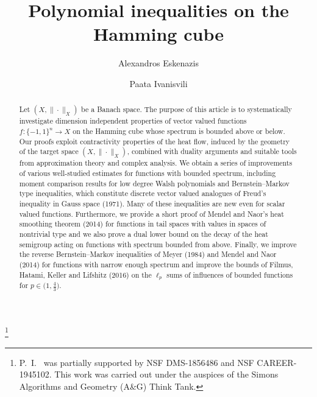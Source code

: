 \documentclass[11pt,reqno]{amsart}
\newcommand{\1}{\mathbf 1}
\theoremstyle{remark}
\begin{document}
\title{Polynomial inequalities on the Hamming cube}


\author{Alexandros Eskenazis}
\address{(A.~E.) Department of Mathematics\\ Princeton University\\ Princeton, NJ 08544-1000, USA}


\author{Paata Ivanisvili}
\address{(P.~I.) Department of Mathematics\\ University of California, Irvine\\ CA 92617, USA}

\thanks{P.~I.~ was partially supported by NSF DMS-1856486 and NSF CAREER-1945102. This work was carried out under the auspices of the Simons Algorithms and Geometry (A\&G) Think Tank.}



\vspace{-0.25in}

\begin{abstract} 
Let $(X,\|\cdot\|_X)$ be a Banach space. The purpose of this article is to systematically investigate dimension independent properties of vector valued functions $f:\{-1,1\}^n\to X$ on the Hamming cube whose spectrum is bounded above or below. Our proofs exploit contractivity properties of the heat flow, induced by the geometry of the target space $(X,\|\cdot\|_X)$, combined with duality arguments and suitable tools from approximation theory and complex analysis. We obtain a series of improvements of various well-studied estimates for functions with bounded spectrum, including moment comparison results for low degree Walsh polynomials and Bernstein--Markov type inequalities, which constitute discrete vector valued analogues of Freud's inequality in Gauss space (1971). Many of these inequalities are new even for scalar valued functions. Furthermore, we provide a short proof of Mendel and Naor's heat smoothing theorem (2014) for functions in tail spaces with values in spaces of nontrivial type and we also prove a dual lower bound on the decay of the heat semigroup acting on functions with spectrum bounded from above. Finally, we improve the reverse Bernstein--Markov inequalities of Meyer (1984) and Mendel and Naor (2014) for functions with narrow enough spectrum and improve the bounds of Filmus, Hatami, Keller and Lifshitz (2016) on the $\ell_p$ sums of influences of bounded functions for $p\in\big(1,\frac{4}{3}\big)$.
\end{abstract}
\end{document}
